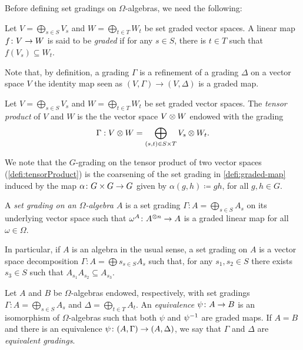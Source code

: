 Before defining set gradings on $\Omega$-algebras, we need the following:

\begin{defi}\label{defi:graded-map}
    Let $V = \bigoplus_{s\in S} V_s$ and $W = \bigoplus_{t\in T} W_t$ be set graded vector spaces. 
    A linear map $f\colon V \to W$ is said to be  \emph{graded} if for any $s \in S$, there is $t \in T$ such that $f(V_s) \subseteq W_t$. 
\end{defi}

Note that, by definition, a grading $\Gamma$ is a refinement of a grading $\Delta$ on a vector space $V$ \IFF the identity map seen as $(V, \Gamma) \to (V, \Delta)$ is a graded map. 

\begin{defi}
    Let $V = \bigoplus_{s\in S} V_s$ and $W = \bigoplus_{t\in T} W_t$ be set graded vector spaces. 
    The \emph{tensor product} of $V$ and $W$ is the the vector space $V \otimes W$ endowed with the grading
    \[
        \Gamma : V \otimes W = \bigoplus_{(s,t) \in S \times T} V_s \otimes W_t. 
    \]
\end{defi}

    We note that the $G$-grading on the tensor product of two  vector spaces (\cref{defi:tensorProduct}) is the coarsening of the set grading in \cref{defi:graded-map} induced by the map $\alpha\colon G\times G \to G$ given by $\alpha (g,h) \coloneqq gh$, for all $g,h \in G$. 

\begin{defi}
    A \emph{set grading on an $\Omega$-algebra $A$} is a set grading $\Gamma : A = \bigoplus_{s\in S} A_s$ on its underlying vector space such that $\omega^A\colon A^{\otimes n} \to A$ is a graded linear map for all $\omega \in \Omega$. 
\end{defi}

In particular, if $A$ is an algebra in the usual sense, a set grading on $A$ is a vector space decomposition $\Gamma : A = \bigoplus s_{s\in S} A_s$ such that, for any $s_1,s_2\in S$ there exists $s_3\in S$ such that $A_{s_1} A_{s_2} \subseteq A_{s_3}$.

\begin{defi}\label{defi:equivalence}
    Let $A$ and $B$ be $\Omega$-algebras endowed, respectively, with set gradings ${\Gamma : A = \bigoplus_{s \in S} A_{s}}$ and ${\Delta = \bigoplus_{t \in T} A_{t}}$. 
    An \emph{equivalence} $\psi\colon A \to B$ is an isomorphism of $\Omega$-algebras such that both $\psi$ and $\psi^{-1}$ are graded maps. 
    If $A = B$ and there is an equivalence $\psi\colon (A, \Gamma) \to (A, \Delta)$, we say that $\Gamma$ and $\Delta$ are \emph{equivalent gradings}. 
\end{defi}

